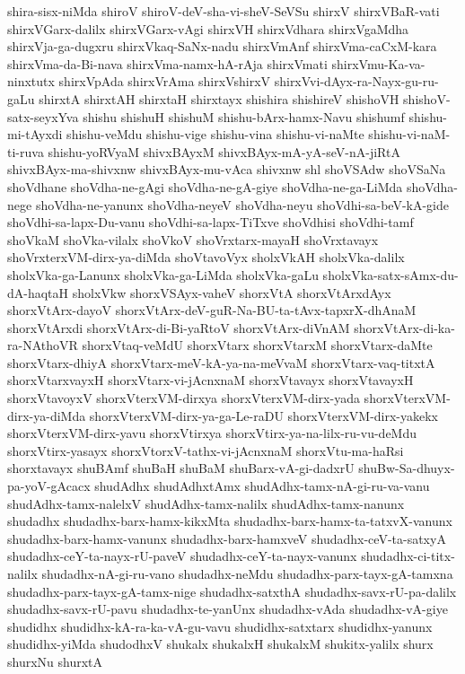 {shira-sisx-niMda
shiroV
shiroV-deV-sha-vi-sheV-SeVSu
shirxV
shirxVBaR-vati
shirxVGarx-dalilx
shirxVGarx-vAgi
shirxVH
shirxVdhara
shirxVgaMdha
shirxVja-ga-dugxru
shirxVkaq-SaNx-nadu
shirxVmAnf
shirxVma-caCxM-kara
shirxVma-da-Bi-nava
shirxVma-namx-hA-rAja
shirxVmati
shirxVmu-Ka-va-ninxtutx
shirxVpAda
shirxVrAma
shirxVshirxV
shirxVvi-dAyx-ra-Nayx-gu-ru-gaLu
shirxtA
shirxtAH
shirxtaH
shirxtayx
shishira
shishireV
shishoVH
shishoV-satx-seyxYva
shishu
shishuH
shishuM
shishu-bArx-hamx-Navu
shishumf
shishu-mi-tAyxdi
shishu-veMdu
shishu-vige
shishu-vina
shishu-vi-naMte
shishu-vi-naM-ti-ruva
shishu-yoRVyaM
shivxBAyxM
shivxBAyx-mA-yA-seV-nA-jiRtA
shivxBAyx-ma-shivxnw
shivxBAyx-mu-vAca
shivxnw
shl
shoVSAdw
shoVSaNa
shoVdhane
shoVdha-ne-gAgi
shoVdha-ne-gA-giye
shoVdha-ne-ga-LiMda
shoVdha-nege
shoVdha-ne-yanunx
shoVdha-neyeV
shoVdha-neyu
shoVdhi-sa-beV-kA-gide
shoVdhi-sa-lapx-Du-vanu
shoVdhi-sa-lapx-TiTxve
shoVdhisi
shoVdhi-tamf
shoVkaM
shoVka-vilalx
shoVkoV
shoVrxtarx-mayaH
shoVrxtavayx
shoVrxterxVM-dirx-ya-diMda
shoVtavoVyx
sholxVkAH
sholxVka-dalilx
sholxVka-ga-Lanunx
sholxVka-ga-LiMda
sholxVka-gaLu
sholxVka-satx-sAmx-du-dA-haqtaH
sholxVkw
shorxVSAyx-vaheV
shorxVtA
shorxVtArxdAyx
shorxVtArx-dayoV
shorxVtArx-deV-guR-Na-BU-ta-tAvx-tapxrX-dhAnaM
shorxVtArxdi
shorxVtArx-di-Bi-yaRtoV
shorxVtArx-diVnAM
shorxVtArx-di-ka-ra-NAthoVR
shorxVtaq-veMdU
shorxVtarx
shorxVtarxM
shorxVtarx-daMte
shorxVtarx-dhiyA
shorxVtarx-meV-kA-ya-na-meVvaM
shorxVtarx-vaq-titxtA
shorxVtarxvayxH
shorxVtarx-vi-jAcnxnaM
shorxVtavayx
shorxVtavayxH
shorxVtavoyxV
shorxVterxVM-dirxya
shorxVterxVM-dirx-yada
shorxVterxVM-dirx-ya-diMda
shorxVterxVM-dirx-ya-ga-Le-raDU
shorxVterxVM-dirx-yakekx
shorxVterxVM-dirx-yavu
shorxVtirxya
shorxVtirx-ya-na-lilx-ru-vu-deMdu
shorxVtirx-yasayx
shorxVtorxV-tathx-vi-jAcnxnaM
shorxVtu-ma-haRsi
shorxtavayx
shuBAmf
shuBaH
shuBaM
shuBarx-vA-gi-dadxrU
shuBw-Sa-dhuyx-pa-yoV-gAcacx
shudAdhx
shudAdhxtAmx
shudAdhx-tamx-nA-gi-ru-va-vanu
shudAdhx-tamx-nalelxV
shudAdhx-tamx-nalilx
shudAdhx-tamx-nanunx
shudadhx
shudadhx-barx-hamx-kikxMta
shudadhx-barx-hamx-ta-tatxvX-vanunx
shudadhx-barx-hamx-vanunx
shudadhx-barx-hamxveV
shudadhx-ceV-ta-satxyA
shudadhx-ceY-ta-nayx-rU-paveV
shudadhx-ceY-ta-nayx-vanunx
shudadhx-ci-titx-nalilx
shudadhx-nA-gi-ru-vano
shudadhx-neMdu
shudadhx-parx-tayx-gA-tamxna
shudadhx-parx-tayx-gA-tamx-nige
shudadhx-satxthA
shudadhx-savx-rU-pa-dalilx
shudadhx-savx-rU-pavu
shudadhx-te-yanUnx
shudadhx-vAda
shudadhx-vA-giye
shudidhx
shudidhx-kA-ra-ka-vA-gu-vavu
shudidhx-satxtarx
shudidhx-yanunx
shudidhx-yiMda
shudodhxV
shukalx
shukalxH
shukalxM
shukitx-yalilx
shurx
shurxNu
shurxtA
}
